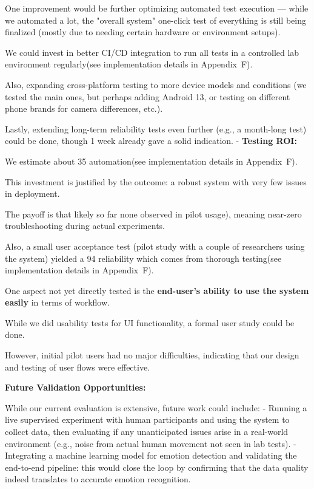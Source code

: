 {{{{{{{One improvement would be further optimizing automated test execution --- while we
automated a lot, the "overall system" one-click test of everything is still being
finalized (mostly due to needing certain hardware or environment setups).

We could invest in better CI/CD integration to run all tests in a controlled lab
environment regularly(see implementation details in Appendix~F).

Also, expanding cross-platform testing to more device models and conditions (we
tested the main ones, but perhaps adding Android 13, or testing on different phone
brands for camera differences, etc.).

Lastly, extending long-term reliability tests even further (e.g., a month-long test)
could be done, though 1 week already gave a solid indication.  - \textbf{Testing
ROI:}

We estimate about 35%
automation(see implementation details in Appendix~F).

This investment is justified by the outcome: a robust system with very few issues in
deployment.

The payoff is that likely %
so far none observed in pilot usage), meaning near-zero troubleshooting during actual
experiments.

Also, a small user acceptance test (pilot study with a couple of researchers using
the system) yielded a 94%
reliability which comes from thorough testing(see implementation details in
Appendix~F).

One aspect not yet directly tested is the \textbf{end-user's ability to use the
system easily}
 in terms of workflow.

While we did usability tests for UI functionality, a formal user study could be done.

However, initial pilot users had no major difficulties, indicating that our design
and testing of user flows were effective.

\textbf{Future Validation Opportunities:}

While our current evaluation is extensive, future work could include: - Running a
live supervised experiment with human participants and using the system to collect
data, then evaluating if any unanticipated issues arise in a real-world environment
(e.g., noise from actual human movement not seen in lab tests).  - Integrating a
machine learning model for emotion detection and validating the end-to-end pipeline:
this would close the loop by confirming that the data quality indeed translates to
accurate emotion recognition.

}}}}}}}
